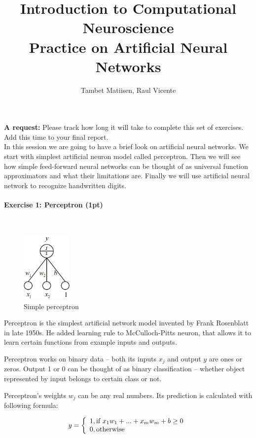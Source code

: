 \documentclass[a4paper,11pt]{article}
\author{\large{Tambet Matiisen, Raul Vicente}}
\title{\huge{Introduction to Computational Neuroscience}\\\LARGE{Practice on Artificial Neural Networks}}
\newenvironment{exercise}[3]{\paragraph{Exercise #1: #2 (#3pt)}\ \\}{
\medskip}
\begin{document}
\maketitle

\textbf{A request:} Please track how long it will take to complete this set of exercises. Add this time to your final report.
\ \\

%
%
In this session we are going to have a brief look on artificial neural networks. We start with simplest artificial neuron model called perceptron. Then we will see how simple feed-forward neural networks can be thought of as universal function approximators and what their limitations are. Finally we will use artificial neural network to recognize handwritten digits.

%
%
\begin{exercise}{1}{Perceptron}{1}

\begin{figure}
	\centering
	\vspace{-12pt}
	\includegraphics[width=0.22\textwidth]{perceptron.png}
	\caption{Simple perceptron}
	\label{fig:perceptronexample}
	\vspace{-5pt}
\end{figure}

Perceptron is the simplest artificial network model invented by Frank Rosenblatt in late 1950s. He added learning rule to McCulloch-Pitts neuron, that allows it to learn certain functions from example inputs and outputs.

Perceptron works on binary data – both its inputs $x_j$ and output $y$ are ones or zeros. Output 1 or 0 can be thought of as binary classification – whether object represented by input  belongs to certain class or not. 

Perceptron’s weights $w_j$ can be any real numbers. Its prediction is calculated with following formula:

$$
y = \left\{
	\begin{array}{l l}
		1, \text{if } x_1 w_1 + ... + x_m w_m + b \geq 0\\
		0, \text{otherwise}
	\end{array}
	\right.
$$


\end{exercise}
\end{document}
